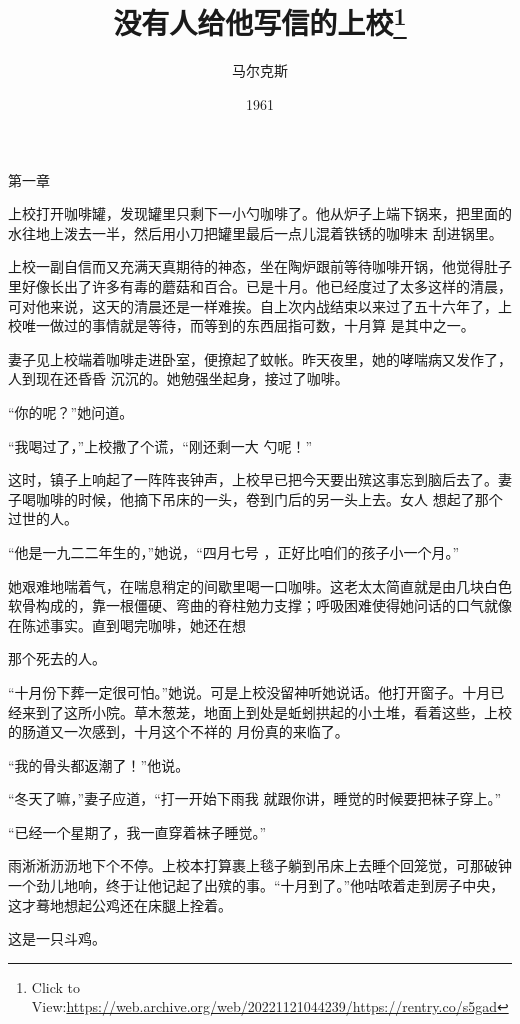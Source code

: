 \documentclass{article}
\title{没有人给他写信的上校\footnote{Click to View:\url{https://web.archive.org/web/20221121044239/https://rentry.co/s5gad}}}
\author{马尔克斯}
\date{1961}
\begin{document}

\maketitle


\Large


﻿第一章 

上校打开咖啡罐，发现罐里只剩下一小勺咖啡了。他从炉子上端下锅来，把里面的水往地上泼去一半，然后用小刀把罐里最后一点儿混着铁锈的咖啡末
刮进锅里。 

上校一副自信而又充满天真期待的神态，坐在陶炉跟前等待咖啡开锅，他觉得肚子里好像长出了许多有毒的蘑菇和百合。已是十月。他已经度过了太多这样的清晨，可对他来说，这天的清晨还是一样难挨。自上次内战结束以来过了五十六年了，上校唯一做过的事情就是等待，而等到的东西屈指可数，十月算
是其中之一。 

\newpage

妻子见上校端着咖啡走进卧室，便撩起了蚊帐。昨天夜里，她的哮喘病又发作了，人到现在还昏昏
沉沉的。她勉强坐起身，接过了咖啡。 


“你的呢？”她问道。 

“我喝过了，”上校撒了个谎，“刚还剩一大
勺呢！” 

这时，镇子上响起了一阵阵丧钟声，上校早已把今天要出殡这事忘到脑后去了。妻子喝咖啡的时候，他摘下吊床的一头，卷到门后的另一头上去。女人
想起了那个过世的人。 

“他是一九二二年生的，”她说，“四月七号
，正好比咱们的孩子小一个月。” 

她艰难地喘着气，在喘息稍定的间歇里喝一口咖啡。这老太太简直就是由几块白色软骨构成的，靠一根僵硬、弯曲的脊柱勉力支撑；呼吸困难使得她问话的口气就像在陈述事实。直到喝完咖啡，她还在想
\newpage

那个死去的人。 

“十月份下葬一定很可怕。”她说。可是上校没留神听她说话。他打开窗子。十月已经来到了这所小院。草木葱茏，地面上到处是蚯蚓拱起的小土堆，看着这些，上校的肠道又一次感到，十月这个不祥的
月份真的来临了。 


“我的骨头都返潮了！”他说。 

“冬天了嘛，”妻子应道，“打一开始下雨我
就跟你讲，睡觉的时候要把袜子穿上。” 

“已经一个星期了，我一直穿着袜子睡觉。”
 

雨淅淅沥沥地下个不停。上校本打算裹上毯子躺到吊床上去睡个回笼觉，可那破钟一个劲儿地响，终于让他记起了出殡的事。“十月到了。”他咕哝着走到房子中央，这才蓦地想起公鸡还在床腿上拴着。

\newpage
这是一只斗鸡。 
\end{document}
